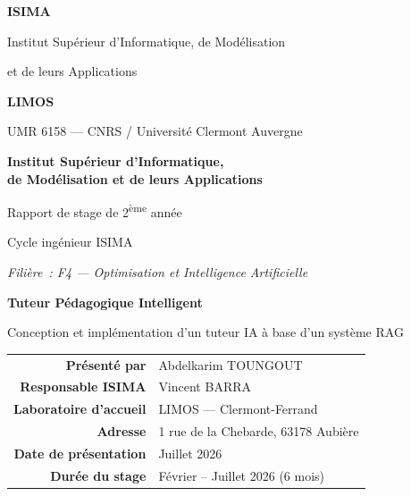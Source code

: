 \documentclass[11pt,a4paper]{article}
\begin{document}
\begin{titlepage}
\centering
\vspace*{1cm}

{\color{bleuPrincipal}\Large\textbf{ISIMA}\par}
\vspace{0.2cm}
{\color{bleuSecondaire}\normalsize Institut Supérieur d'Informatique, de Modélisation\par}
{\color{bleuSecondaire}\normalsize et de leurs Applications\par}

\vspace{0.8cm}

{\color{bleuPrincipal}\Large\textbf{LIMOS}\par}
\vspace{0.2cm}
{\color{bleuSecondaire}\normalsize UMR 6158 — CNRS / Université Clermont Auvergne\par}

\vspace{1.5cm}

{\large\textbf{Institut Supérieur d'Informatique,}\\\textbf{de Modélisation et de leurs Applications}\par}
\vspace{0.3cm}
{\normalsize Rapport de stage de 2\textsuperscript{ème} année\par}
{\normalsize Cycle ingénieur ISIMA\par}
\vspace{0.3cm}
{\normalsize\textit{Filière~: F4 --- Optimisation et Intelligence Artificielle}\par}

\vspace{2cm}

{\color{bleuPrincipal}\LARGE\bfseries Tuteur Pédagogique Intelligent\par}
\vspace{0.4cm}
{\color{bleuSecondaire}\large Conception et implémentation d'un tuteur IA à base d'un système RAG\par}

\vspace{2.5cm}

\begin{tabular}{rl}
\toprule
\textbf{Présenté par}          & Abdelkarim TOUNGOUT \\
\textbf{Responsable ISIMA}     & Vincent BARRA \\
\textbf{Laboratoire d'accueil} & LIMOS --- Clermont-Ferrand \\
\textbf{Adresse}               & 1 rue de la Chebarde, 63178 Aubière \\
\textbf{Date de présentation}  & Juillet 2026 \\
\textbf{Durée du stage}        & Février -- Juillet 2026 (6 mois) \\
\bottomrule
\end{tabular}


\end{titlepage}
\end{document}
